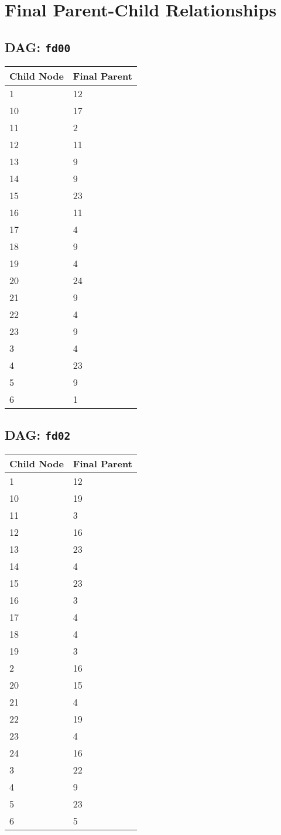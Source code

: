 \documentclass{article}
\begin{document}
\pagestyle{fancy}
\fancyhf{}
\section*{Final Parent-Child Relationships}
\subsection*{DAG: \texttt{fd00}}
\begin{tabular}{ll}
\toprule
\textbf{Child Node} & \textbf{Final Parent} \\
\midrule
1 & 12 \\
10 & 17 \\
11 & 2 \\
12 & 11 \\
13 & 9 \\
14 & 9 \\
15 & 23 \\
16 & 11 \\
17 & 4 \\
18 & 9 \\
19 & 4 \\
20 & 24 \\
21 & 9 \\
22 & 4 \\
23 & 9 \\
3 & 4 \\
4 & 23 \\
5 & 9 \\
6 & 1 \\
\bottomrule
\end{tabular}

\subsection*{DAG: \texttt{fd02}}
\begin{tabular}{ll}
\toprule
\textbf{Child Node} & \textbf{Final Parent} \\
\midrule
1 & 12 \\
10 & 19 \\
11 & 3 \\
12 & 16 \\
13 & 23 \\
14 & 4 \\
15 & 23 \\
16 & 3 \\
17 & 4 \\
18 & 4 \\
19 & 3 \\
2 & 16 \\
20 & 15 \\
21 & 4 \\
22 & 19 \\
23 & 4 \\
24 & 16 \\
3 & 22 \\
4 & 9 \\
5 & 23 \\
6 & 5 \\
\bottomrule
\end{tabular}
\end{document}
